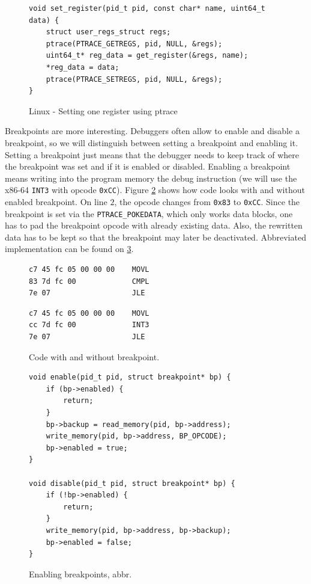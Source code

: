 \begin{figure}\label{fig:set-register}
    \begin{verbatim}
void set_register(pid_t pid, const char* name, uint64_t data) {
    struct user_regs_struct regs;
    ptrace(PTRACE_GETREGS, pid, NULL, &regs);
    uint64_t* reg_data = get_register(&regs, name);
    *reg_data = data;
    ptrace(PTRACE_SETREGS, pid, NULL, &regs);
}
    \end{verbatim}
    \caption{Linux - Setting one register using ptrace}
\end{figure}

Breakpoints are more interesting. Debuggers often allow to enable and disable a
breakpoint, so we will distinguish between setting a breakpoint and enabling
it. Setting a breakpoint just means that the debugger needs to keep track of
where the breakpoint was set and if it is enabled or disabled. Enabling a
breakpoint means writing into the program memory the debug instruction (we will
use the x86-64 \texttt{INT3} with opcode \texttt{0xCC}). Figure
\ref{fig:with-and-without-bp} shows how code looks with and without enabled
breakpoint. On line $2$, the opcode changes from \texttt{0x83} to
\texttt{0xCC}. Since the breakpoint is set via the \texttt{PTRACE\_POKEDATA},
which only works data blocks, one has to pad the breakpoint opcode with already
existing data. Also, the rewritten data has to be kept so that the breakpoint
may later be deactivated. Abbreviated implementation can be found on
\ref{fig:breakpoint-enable}.

\begin{figure}\label{fig:with-and-without-bp}
    \begin{minipage}{0.45\textwidth}
        \begin{lstlisting}
c7 45 fc 05 00 00 00 	MOVL
83 7d fc 00          	CMPL
7e 07                	JLE
        \end{lstlisting}
    \end{minipage}
    \begin{minipage}{0.45\textwidth}
        \begin{lstlisting}
c7 45 fc 05 00 00 00 	MOVL
cc 7d fc 00          	INT3
7e 07                	JLE
        \end{lstlisting}
    \end{minipage}
    \caption{Code with and without breakpoint.}
\end{figure}

\begin{figure}\label{fig:breakpoint-enable}
    \begin{verbatim}
void enable(pid_t pid, struct breakpoint* bp) {
    if (bp->enabled) {
        return;
    }
    bp->backup = read_memory(pid, bp->address);
    write_memory(pid, bp->address, BP_OPCODE);
    bp->enabled = true;
}

void disable(pid_t pid, struct breakpoint* bp) {
    if (!bp->enabled) {
        return;
    }
    write_memory(pid, bp->address, bp->backup);
    bp->enabled = false;
}
    \end{verbatim}
    \caption{Enabling breakpoints, abbr.}
\end{figure}

